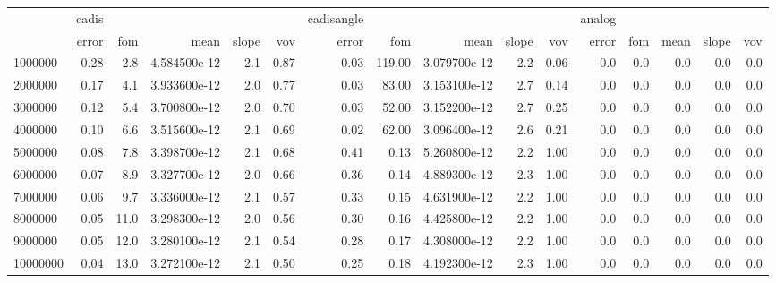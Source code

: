 \begin{tabular}{lrrrrrrrrrrrrrrr}
\toprule
{} & cadis &      &               &       &      & cadisangle &        &               &       &      & analog &     &      &       &     \\
{} & error &  fom &          mean & slope &  vov &      error &    fom &          mean & slope &  vov &  error & fom & mean & slope & vov \\
\midrule
1000000  &  0.28 &  2.8 &  4.584500e-12 &   2.1 & 0.87 &       0.03 & 119.00 &  3.079700e-12 &   2.2 & 0.06 &    0.0 & 0.0 &  0.0 &   0.0 & 0.0 \\
2000000  &  0.17 &  4.1 &  3.933600e-12 &   2.0 & 0.77 &       0.03 &  83.00 &  3.153100e-12 &   2.7 & 0.14 &    0.0 & 0.0 &  0.0 &   0.0 & 0.0 \\
3000000  &  0.12 &  5.4 &  3.700800e-12 &   2.0 & 0.70 &       0.03 &  52.00 &  3.152200e-12 &   2.7 & 0.25 &    0.0 & 0.0 &  0.0 &   0.0 & 0.0 \\
4000000  &  0.10 &  6.6 &  3.515600e-12 &   2.1 & 0.69 &       0.02 &  62.00 &  3.096400e-12 &   2.6 & 0.21 &    0.0 & 0.0 &  0.0 &   0.0 & 0.0 \\
5000000  &  0.08 &  7.8 &  3.398700e-12 &   2.1 & 0.68 &       0.41 &   0.13 &  5.260800e-12 &   2.2 & 1.00 &    0.0 & 0.0 &  0.0 &   0.0 & 0.0 \\
6000000  &  0.07 &  8.9 &  3.327700e-12 &   2.0 & 0.66 &       0.36 &   0.14 &  4.889300e-12 &   2.3 & 1.00 &    0.0 & 0.0 &  0.0 &   0.0 & 0.0 \\
7000000  &  0.06 &  9.7 &  3.336000e-12 &   2.1 & 0.57 &       0.33 &   0.15 &  4.631900e-12 &   2.2 & 1.00 &    0.0 & 0.0 &  0.0 &   0.0 & 0.0 \\
8000000  &  0.05 & 11.0 &  3.298300e-12 &   2.0 & 0.56 &       0.30 &   0.16 &  4.425800e-12 &   2.2 & 1.00 &    0.0 & 0.0 &  0.0 &   0.0 & 0.0 \\
9000000  &  0.05 & 12.0 &  3.280100e-12 &   2.1 & 0.54 &       0.28 &   0.17 &  4.308000e-12 &   2.2 & 1.00 &    0.0 & 0.0 &  0.0 &   0.0 & 0.0 \\
10000000 &  0.04 & 13.0 &  3.272100e-12 &   2.1 & 0.50 &       0.25 &   0.18 &  4.192300e-12 &   2.3 & 1.00 &    0.0 & 0.0 &  0.0 &   0.0 & 0.0 \\
\bottomrule
\end{tabular}
